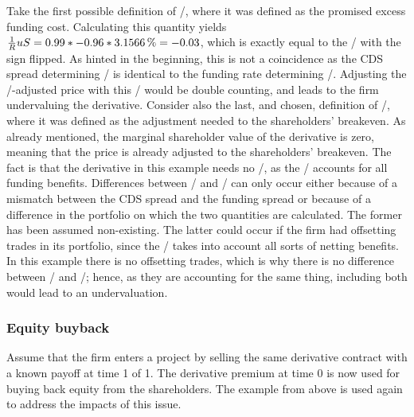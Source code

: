 \documentclass[../main.tex]{subfiles}
\begin{document}
            Take the first possible definition of \FVA/, 
            where it was defined as the promised excess funding cost.
            Calculating this quantity yields 
            $\discountfactor u S = \num{0.99} * \num{-0.96} * \pct{0.031566} = \num{-0.03}$,
            which is exactly equal to the \DVA/ with the sign flipped.
            As hinted in the beginning, 
            this is not a coincidence as the CDS spread determining \DVA/
            is identical to the funding rate determining \FVA/.
            Adjusting the \DVA/-adjusted price with this \FVA/ would be double counting,
            and leads to the firm undervaluing the derivative.
            Consider also the last, and chosen, definition of \FVA/,
            where it was defined as the adjustment needed to the shareholders' breakeven.
            As already mentioned, the marginal shareholder value of the derivative is zero,
            meaning that the price is already adjusted to the shareholders' breakeven.
            The fact is that the derivative in this example needs no \FVA/,
            as the \DVA/ accounts for all funding benefits.
            Differences between \DVA/ and \FBA/ can only occur either because of a
            mismatch between the CDS spread and the funding spread
            or because of a difference in the portfolio on which the two quantities are calculated. 
            The former has been assumed non-existing.
            The latter could occur if the firm had offsetting trades in its portfolio,
            since the \FVA/ takes into account all sorts of netting benefits.
            In this example there is no offsetting trades, 
            which is why there is no difference between \DVA/ and \FBA/;
            hence, as they are accounting for the same thing, 
            including both would lead to an undervaluation.

        \subsubsection{Equity buyback}
            Assume that the firm enters a project 
            by selling the same derivative contract with a known payoff at time 1 of 1. 
            The derivative premium at time 0 is now used for buying back equity from the shareholders. 
            The example from above is used again to address the impacts of this issue.
\end{document}
